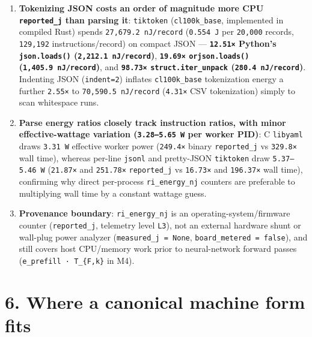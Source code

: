 \documentclass[10pt,letterpaper]{article}
\providecommand{\tightlist}{\setlength{\itemsep}{1pt}\setlength{\parskip}{0pt}}
\begin{document}
\begin{enumerate}
\def\labelenumi{\arabic{enumi}.}
\tightlist
\item
  \textbf{Tokenizing JSON costs an order of magnitude more CPU
  \texttt{reported\_j} than parsing it}: \texttt{tiktoken}
  (\texttt{cl100k\_base}, implemented in compiled Rust) spends
  \texttt{27,\allowbreak{}679.\allowbreak{}2\ nJ/\allowbreak{}record} (\texttt{0.554\ J} per \texttt{20,000}
  records, \texttt{129,192} instructions/record) on compact JSON ---
  \textbf{\texttt{12.51×} Python's \texttt{json.loads()}
  (\texttt{2,\allowbreak{}212.\allowbreak{}1\ nJ/\allowbreak{}record})}, \textbf{\texttt{19.69×}
  \texttt{orjson.loads()} (\texttt{1,\allowbreak{}405.\allowbreak{}9\ nJ/\allowbreak{}record})}, and
  \textbf{\texttt{98.73×} \texttt{struct.\allowbreak{}iter\_\allowbreak{}unpack}
  (\texttt{280.\allowbreak{}4\ nJ/\allowbreak{}record})}. Indenting JSON (\texttt{indent=2})
  inflates \texttt{cl100k\_base} tokenization energy a further
  \texttt{2.55×} to \texttt{70,\allowbreak{}590.\allowbreak{}5\ nJ/\allowbreak{}record} (\texttt{4.31×} CSV
  tokenization) simply to scan whitespace runs.
\item
  \textbf{Parse energy ratios closely track instruction ratios, with
  minor effective-wattage variation (\texttt{3.28–5.65\ W} per worker
  PID)}: C \texttt{libyaml} draws \texttt{3.31\ W} effective worker
  power (\texttt{249.4×} binary \texttt{reported\_j} vs \texttt{329.8×}
  wall time), whereas per-line \texttt{jsonl} and pretty-JSON
  \texttt{tiktoken} draw \texttt{5.37–5.46\ W} (\texttt{21.87×} and
  \texttt{251.78×} \texttt{reported\_j} vs \texttt{16.73×} and
  \texttt{196.37×} wall time), confirming why direct per-process
  \texttt{ri\_energy\_nj} counters are preferable to multiplying wall
  time by a constant wattage guess.
\item
  \textbf{Provenance boundary}: \texttt{ri\_energy\_nj} is an
  operating-system/firmware counter (\texttt{reported\_j}, telemetry
  level \texttt{L3}), not an external hardware shunt or wall-plug power
  analyzer (\texttt{measured\_\allowbreak{}j\ =\ None},
  \texttt{board\_\allowbreak{}metered\ =\ false}), and still covers host CPU/memory
  work prior to neural-network forward passes
  (\texttt{e\_prefill\ ·\ T\_\{F,k\}} in M4).
\end{enumerate}

\section{6. Where a canonical machine form
fits}\label{where-a-canonical-machine-form-fits}
\end{document}

